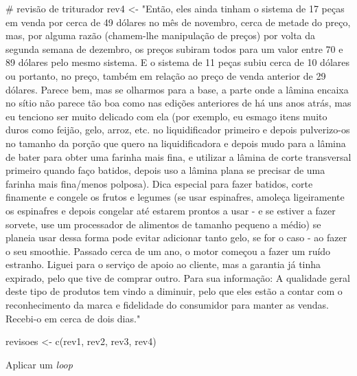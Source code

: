 \documentclass[
  letterpaper,
  paper=6in:9in,
  pagesize=pdftex,
  headinclude=on,
  footinclude=on,
  12pt]{scrbook}
\newenvironment{Shaded}{\begin{snugshade}}{\end{snugshade}}
\newcommand{\CommentTok}[1]{\textcolor[rgb]{0.37,0.37,0.37}{#1}}
\newcommand{\FunctionTok}[1]{\textcolor[rgb]{0.28,0.35,0.67}{#1}}
\newcommand{\NormalTok}[1]{\textcolor[rgb]{0.00,0.23,0.31}{#1}}
\newcommand{\OtherTok}[1]{\textcolor[rgb]{0.00,0.23,0.31}{#1}}
\newcommand{\StringTok}[1]{\textcolor[rgb]{0.13,0.47,0.30}{#1}}
\begin{document}
\begin{Shaded}
\begin{Highlighting}[]
\CommentTok{\# revisão de triturador}
\NormalTok{rev4 }\OtherTok{\textless{}{-}} \StringTok{"Então, eles ainda tinham o sistema de 17 peças em venda por cerca de 49 dólares no mês de novembro, }
\StringTok{cerca de metade do preço, mas, por alguma razão (chamem{-}lhe manipulação de preços) }
\StringTok{por volta da segunda semana de dezembro, os preços subiram todos }
\StringTok{para um valor entre 70 e 89 dólares pelo mesmo }
\StringTok{sistema. E o sistema de 11 peças subiu cerca de 10 dólares ou }
\StringTok{portanto, no preço, também em relação ao preço de venda anterior de 29 dólares.}
\StringTok{Parece bem, mas se olharmos para a base, a parte}
\StringTok{onde a lâmina encaixa no sítio não parece tão boa}
\StringTok{como nas edições anteriores de há uns anos atrás, mas eu }
\StringTok{tenciono ser muito delicado com ela (por exemplo, eu esmago }
\StringTok{itens muito duros como feijão, gelo, arroz, etc. no  }
\StringTok{liquidificador primeiro e depois pulverizo{-}os no tamanho da porção que}
\StringTok{quero na liquidificadora e depois mudo para a lâmina de bater }
\StringTok{para obter uma farinha mais fina, e utilizar a lâmina de corte transversal }
\StringTok{primeiro quando faço batidos, depois uso a lâmina plana }
\StringTok{se precisar de uma farinha mais fina/menos polposa). Dica especial para fazer batidos, }
\StringTok{corte finamente e congele os frutos e }
\StringTok{legumes (se usar espinafres, amoleça ligeiramente os  }
\StringTok{espinafres e depois congelar até estarem prontos a usar {-} e se estiver a fazer }
\StringTok{sorvete, use um processador de alimentos de tamanho pequeno a médio)  }
\StringTok{se planeia usar dessa forma pode evitar adicionar tanto }
\StringTok{gelo, se for o caso {-} ao fazer o seu smoothie. }
\StringTok{Passado cerca de um ano, o motor começou a fazer um ruído estranho. }
\StringTok{Liguei para o serviço de apoio ao cliente, mas a garantia já tinha expirado, }
\StringTok{pelo que tive de comprar outro. Para sua informação: }
\StringTok{A qualidade geral deste tipo de produtos tem vindo a diminuir, pelo que }
\StringTok{eles estão a contar com o reconhecimento da marca e }
\StringTok{fidelidade do consumidor para manter as vendas. Recebi{-}o em cerca de}
\StringTok{dois dias."}

\NormalTok{revisoes }\OtherTok{\textless{}{-}} \FunctionTok{c}\NormalTok{(rev1, rev2, rev3, rev4)}
\end{Highlighting}
\end{Shaded}

Aplicar um \emph{loop}
\end{document}
